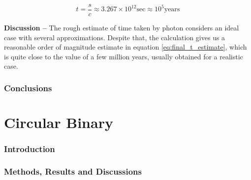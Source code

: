 \documentclass[a4paper]{article}
\begin{document}
\begin{enumerate} [label*=\textbf{(\alph*)}]
					\begin{equation}
					 	t = \frac{s}{c} \approx 3.267 \times 10^{12}_{} \text{sec} \approx 10^5 \text{years}
					 	\label{eq:final_t_estimate}
					\end{equation}
					
				\subitem \textbf{Discussion --}
					The rough estimate of time taken by photon considers an ideal case with several approximations. Despite that, the calculation gives us a reasonable order of magnitude estimate in equation \ref{eq:final_t_estimate}, which is quite close to the value of a few million years, usually obtained for a realistic case.
			
		\end{enumerate}

		
		\section{Conclusions} \label{1:conclusions}
		
		

	
	
	\clearpage
	\setcounter{section}{0}
	\part{Circular Binary} \label{Problem2}
	

		\section{Introduction} \label{2:introduction}

		
		\section{Methods, Results and Discussions}
		
\end{document}
